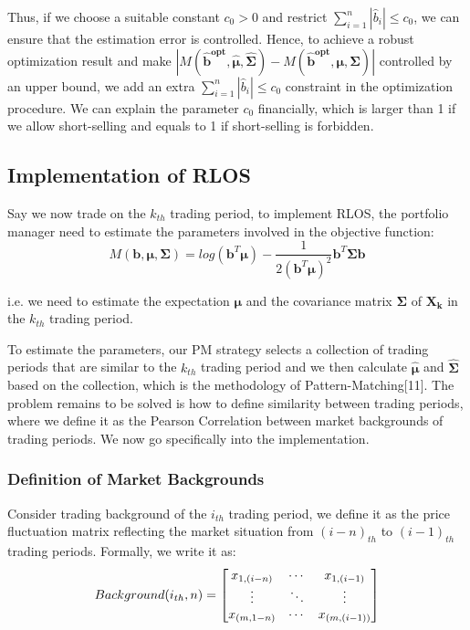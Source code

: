 \documentclass{gapd}
\begin{document}
Thus, if we choose a suitable constant $c_0>0$ and restrict $\sum_{i=1}^n|\hat{b}_i|\le c_0$, we can ensure that the estimation error is controlled. Hence, to achieve a robust optimization result and make $|M(\mathbf{\hat{b}^{opt}},\boldsymbol{\hat{\mu}},\boldsymbol{\hat{\Sigma}})-M(\mathbf{\hat{b}^{opt}},\boldsymbol{\mu},\boldsymbol{\Sigma})|$ controlled by an upper bound, we add an extra $\sum_{i=1}^n|\hat{b}_i|\le c_0$ constraint in the optimization procedure. We can explain the parameter $c_0$ financially, which is larger than 1 if we allow short-selling and equals to 1 if short-selling is forbidden.

\subsection{Implementation of RLOS}

Say we now trade on the $k_{th}$ trading period, to implement RLOS, the portfolio manager need to estimate the parameters involved in the objective function:
\begin{equation}
M(\mathbf{b},\boldsymbol{\mu},\boldsymbol{\Sigma})=log(\mathbf{b}^T \boldsymbol{\mu})-\frac{1}{2(\mathbf{b}^T\boldsymbol{\mu})^2}\mathbf{b}^T\mathbf{\Sigma}\mathbf{b} \tag{4}
\end{equation}

i.e. we need to estimate the expectation $\boldsymbol{\mu}$ and the covariance matrix $\boldsymbol{\Sigma}$ of $\mathbf{X_k}$ in the $k_{th}$ trading period.

To estimate the parameters, our PM strategy selects a collection of trading periods that are similar to the $k_{th}$ trading period and we then calculate $\hat{\boldsymbol{\mu}}$ and $\hat{\boldsymbol{\Sigma}}$ based on the collection, which is the methodology of Pattern-Matching[11]. The problem remains to be solved is how to define similarity between trading periods, where we define it as the Pearson Correlation between market backgrounds of trading periods. We now go specifically into the implementation. 

\subsubsection{Definition of Market Backgrounds}

Consider trading background of the $i_{th}$ trading period, we define it as the price fluctuation matrix reflecting the market situation from $(i-n)_{th}$ to $(i-1)_{th}$ trading periods. Formally, we write it as:
\begin{equation}
Background(i_{th},n)=
\left[\begin{matrix}
x_{1,(i-n)} & \cdots & x_{1,(i-1)}\\
\vdots & \ddots & \vdots\\
x_{(m,1-n)} & \cdots & x_{(m,(i-1))}
\end{matrix} \right] \notag
\end{equation}
\end{document}
